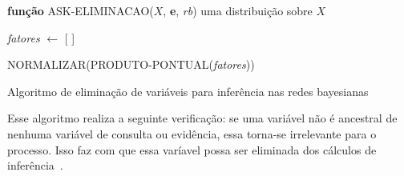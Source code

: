 \begin{algorithm}
    \textbf{função} ASK-ELIMINACAO($X$, \textbf{e}, \emph{rb}) \Retorna uma distribuição sobre $X$

    \emph{fatores} $\gets$ [ ]

    \Retorna NORMALIZAR(PRODUTO-PONTUAL(\emph{fatores}))
    \caption{Algoritmo de eliminação de variáveis para inferência nas redes bayesianas~\cite{russell:2002}}
    \label{alg:eliminacao-variaveis}
\end{algorithm}

Esse algoritmo realiza a seguinte verificação: se uma variável não é ancestral de nenhuma variável de consulta ou evidência, essa torna-se irrelevante para o processo. Isso faz com que essa varíavel possa ser eliminada dos cálculos de inferência~\cite{russell:2002}.

